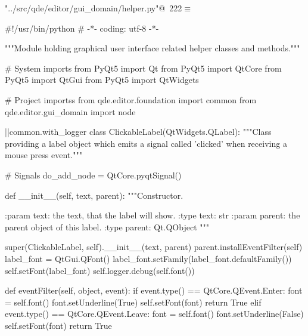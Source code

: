 \documentclass[%
    a4paper,    %
    justified,  %
    nobib,      %
    openany     %
]{tufte-book}
\makeatletter
\renewcommand{\label}[1]{\@tufte@label{##1}}%
\makeatother
\begin{document}
\begin{fullwidth}
\begin{flushleft}
\begin{minipage}{\linewidth}
\begin{list}{}{\setlength{\itemsep}{-\parsep}\setlength{\itemindent}{-\leftmargin}}
\item{}
\end{list}
\end{minipage}\vspace{4ex}
\end{flushleft}

\begin{flushleft} \small
\begin{minipage}{\linewidth}\label{scrap227}\raggedright\small
{} \verb@"../src/qde/editor/gui_domain/helper.py"@\nobreak\ {\footnotesize {222}}$\equiv$
\vspace{-1ex}
\begin{pythoncode}
#!/usr/bin/python
# -*- coding: utf-8 -*-

"""Module holding graphical user interface related helper classes and
methods."""

# System imports
from PyQt5 import Qt
from PyQt5 import QtCore
from PyQt5 import QtGui
from PyQt5 import QtWidgets

# Project importss
from qde.editor.foundation import common
from qde.editor.gui_domain import node


|\normalfont{}\fontfamily{}|common.with_logger
class ClickableLabel(QtWidgets.QLabel):
    """Class providing a label object which emits a signal called 'clicked'
    when receiving a mouse press event."""

    # Signals
    do_add_node = QtCore.pyqtSignal()

    def __init__(self, text, parent):
        """Constructor.

        :param text: the text, that the label will show.
        :type text: str
        :param parent: the parent object of this label.
        :type parent: Qt.QObject
        """

        super(ClickableLabel, self).__init__(text, parent)
        parent.installEventFilter(self)
        label_font = QtGui.QFont()
        label_font.setFamily(label_font.defaultFamily())
        self.setFont(label_font)
        self.logger.debug(self.font())

    def eventFilter(self, object, event):
        if event.type() == QtCore.QEvent.Enter:
            font = self.font()
            font.setUnderline(True)
            self.setFont(font)
            return True
        elif event.type() == QtCore.QEvent.Leave:
            font = self.font()
            font.setUnderline(False)
            self.setFont(font)
            return True


\end{pythoncode}
\end{minipage}
\end{flushleft}
\end{fullwidth}
\end{document}
